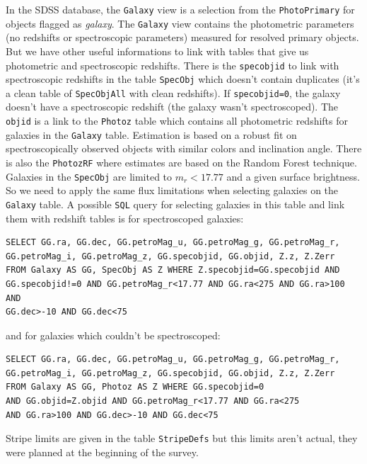 In the SDSS database, the \texttt{Galaxy} view is a selection from the
\texttt{PhotoPrimary} for objects flagged as \emph{galaxy}. The
\texttt{Galaxy} view contains the photometric parameters (no redshifts or
spectroscopic parameters) measured for resolved primary objects. But we have
other useful informations to link with tables that give us photometric and
spectroscopic redshifts. There is the \texttt{specobjid} to link with
spectroscopic redshifts in the table \texttt{SpecObj} which doesn't contain
duplicates (it's a clean table of \texttt{SpecObjAll} with clean redshifts).
If \texttt{specobjid=0}, the galaxy doesn't have a spectroscopic redshift
(the galaxy wasn't spectroscoped). The \texttt{objid} is a link to the
\texttt{Photoz} table which contains all photometric redshifts for galaxies
in the \texttt{Galaxy} table. Estimation is based on a robust fit on
spectroscopically observed objects with similar colors and inclination
angle. There is also the \texttt{PhotozRF} where estimates are based on the
Random Forest technique. Galaxies in the \texttt{SpecObj} are limited to
$m_r<17.77$ and a given surface brightness. So we need to apply the same
flux limitations when selecting galaxies on the \texttt{Galaxy} table. A
possible \texttt{SQL} query for selecting galaxies in this table and link
them with redshift tables is for spectroscoped galaxies:
%
\begin{listing}[H]
    \begin{verbatim}
SELECT GG.ra, GG.dec, GG.petroMag_u, GG.petroMag_g, GG.petroMag_r,
GG.petroMag_i, GG.petroMag_z, GG.specobjid, GG.objid, Z.z, Z.Zerr
FROM Galaxy AS GG, SpecObj AS Z WHERE Z.specobjid=GG.specobjid AND
GG.specobjid!=0 AND GG.petroMag_r<17.77 AND GG.ra<275 AND GG.ra>100 AND
GG.dec>-10 AND GG.dec<75
    \end{verbatim}
\end{listing}
%
and for galaxies which couldn't be spectroscoped:
%
\begin{listing}[H]
    \begin{verbatim}
SELECT GG.ra, GG.dec, GG.petroMag_u, GG.petroMag_g, GG.petroMag_r,
GG.petroMag_i, GG.petroMag_z, GG.specobjid, GG.objid, Z.z, Z.Zerr
FROM Galaxy AS GG, Photoz AS Z WHERE GG.specobjid=0
AND GG.objid=Z.objid AND GG.petroMag_r<17.77 AND GG.ra<275
AND GG.ra>100 AND GG.dec>-10 AND GG.dec<75
    \end{verbatim}
\end{listing}

Stripe limits are given in the table \texttt{StripeDefs} but this
limits aren't actual, they were planned at the beginning of the survey.

